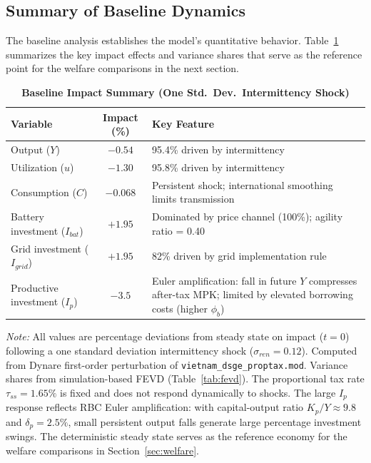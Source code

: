 \documentclass[12pt, a4paper]{article}
\begin{document}
\subsection{Summary of Baseline Dynamics}

The baseline analysis establishes the model's quantitative behavior. Table~\ref{tab:baseline_summary} summarizes the key impact effects and variance shares that serve as the reference point for the welfare comparisons in the next section.

\begin{table}[H]
    \centering
    \caption{\textbf{Baseline Impact Summary (One Std.\ Dev.\ Intermittency Shock)}}
    \label{tab:baseline_summary}
    \renewcommand{\arraystretch}{1.3}
    \small
    \begin{tabular}{l c l}
        \toprule
        \textbf{Variable} & \textbf{Impact (\%)} & \textbf{Key Feature} \\
        \midrule
        Output ($Y$) & $-0.54$ & 95.4\% driven by intermittency \\
        Utilization ($u$) & $-1.30$ & 95.8\% driven by intermittency \\
        Consumption ($C$) & $-0.068$ & Persistent shock; international smoothing limits transmission \\
        Battery investment ($I_{bat}$) & $+1.95$ & Dominated by price channel (100\%); agility ratio = 0.40 \\
        Grid investment ($I_{grid}$) & $+1.95$ & 82\% driven by grid implementation rule \\
        Productive investment ($I_p$) & $-3.5$ & Euler amplification: fall in future $Y$ compresses after-tax MPK; limited by elevated borrowing costs (higher $\phi_b$) \\
        \bottomrule
    \end{tabular}
    \vspace{0.2cm}
    \parbox{\textwidth}{\footnotesize \textit{Note:} All values are percentage deviations from steady state on impact ($t=0$) following a one standard deviation intermittency shock ($\sigma_{ren} = 0.12$). Computed from Dynare first-order perturbation of \texttt{vietnam\_dsge\_proptax.mod}. Variance shares from simulation-based FEVD (Table~\ref{tab:fevd}). The proportional tax rate $\tau_{ss}=1.65\%$ is fixed and does not respond dynamically to shocks. The large $I_p$ response reflects RBC Euler amplification: with capital-output ratio $K_p/Y \approx 9.8$ and $\delta_p = 2.5\%$, small persistent output falls generate large percentage investment swings. The deterministic steady state serves as the reference economy for the welfare comparisons in Section~\ref{sec:welfare}.}
\end{table}
\end{document}
